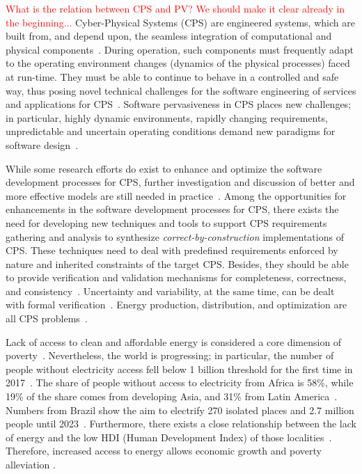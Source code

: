\textcolor{red}{What is the relation between CPS and PV? We should make it clear already in the beginning...}
Cyber-Physical Systems (CPS) are engineered systems, which are built from, and depend upon, the seamless integration of computational and physical components~\cite{NSF2015,ChavesIBCF19}. During operation, such components must frequently adapt to the operating environment changes (dynamics of the physical processes) faced at run-time. They must be able to continue to behave in a controlled and safe way, thus posing novel technical challenges for the software engineering of services and applications for CPS~\cite{Metzger2014}. Software pervasiveness in CPS places new challenges; in particular, highly dynamic environments, rapidly changing requirements, unpredictable and uncertain operating conditions demand new paradigms for software design~\cite{Filieri2015}.

While some research efforts do exist to enhance and optimize the software development processes for CPS, further investigation and discussion of better and more effective models are still needed in practice~\cite{Al-Jaroodi2016}. Among the opportunities for enhancements in the software development processes for CPS, there exists the need for developing new techniques and tools to support CPS requirements gathering and analysis to synthesize \textit{correct-by-construction} implementations of CPS. These techniques need to deal with predefined requirements enforced by nature and inherited constraints of the target CPS. Besides, they should be able to provide verification and validation mechanisms for completeness, correctness, and consistency~\cite{Al-Jaroodi2016}. Uncertainty and variability, at the same time, can be dealt with formal verification~\cite{NESSI}. Energy production, distribution, and optimization are all CPS problems~\cite{UC}. 

Lack of access to clean and affordable energy is considered a core dimension of poverty~\cite{Hussein2012}. Nevertheless, the world is progressing; in particular, the number of people without electricity access fell below 1 billion threshold for the first time in 2017~\cite{IEAweo2018}. The share of people without access to electricity from Africa is 58\%, while 19\% of the share comes from developing Asia, and 31\% from Latin America~\cite{IEAweo2018}. Numbers from Brazil show the aim to electrify 270 isolated places and 2.7 million people until 2023~\cite{EPE2018}. 
Furthermore, there exists a close relationship between the lack of energy and the low HDI (Human Development Index) of those localities~\cite{Coelho}. Therefore, increased access to energy allows economic growth and poverty alleviation \cite{Karekesi}.

